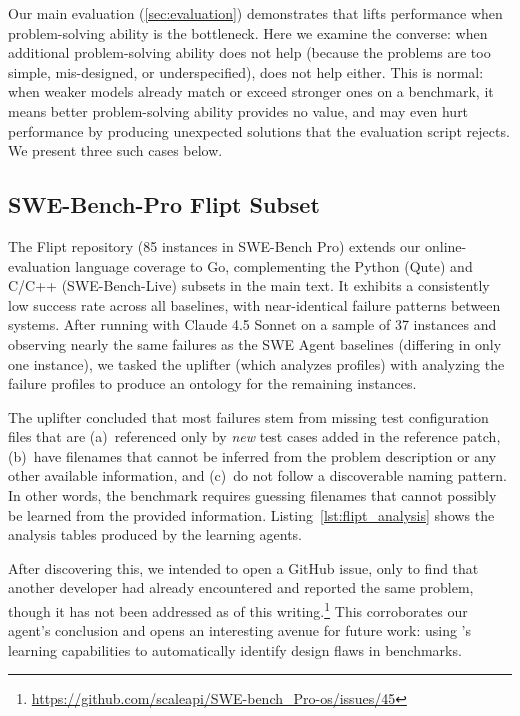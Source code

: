 Our main evaluation (\cref{sec:evaluation}) demonstrates that \sysname lifts performance when problem-solving ability is the bottleneck.
Here we examine the converse: when additional problem-solving ability does not help (because the problems are too simple, mis-designed, or underspecified), \sysname does not help either.
This is normal: when weaker models already match or exceed stronger ones on a benchmark, it means better problem-solving ability provides no value, and may even hurt performance by producing unexpected solutions that the evaluation script rejects.
We present three such cases below.

\subsection{SWE-Bench-Pro Flipt Subset}
\label{sec:app_flipt}

The Flipt repository (85 instances in SWE-Bench Pro) extends our online-evaluation language coverage to Go, complementing the Python (Qute) and C/C++ (SWE-Bench-Live) subsets in the main text. It exhibits a consistently low success rate across all baselines, with near-identical failure patterns between systems.
After running \sysname with Claude 4.5 Sonnet on a sample of 37 instances and observing nearly the same failures as the SWE Agent baselines (differing in only one instance), we tasked the uplifter (which analyzes profiles) with analyzing the failure profiles to produce an ontology for the remaining instances.

The uplifter concluded that most failures stem from missing test configuration files that are (a)~referenced only by \emph{new} test cases added in the reference patch, (b)~have filenames that cannot be inferred from the problem description or any other available information, and (c)~do not follow a discoverable naming pattern.
In other words, the benchmark requires guessing filenames that cannot possibly be learned from the provided information.
Listing~\ref{lst:flipt_analysis} shows the analysis tables produced by the learning agents.

After discovering this, we intended to open a GitHub issue, only to find that another developer had already encountered and reported the same problem, though it has not been addressed as of this writing.\footnote{\url{https://github.com/scaleapi/SWE-bench_Pro-os/issues/45}}
This corroborates our agent's conclusion and opens an interesting avenue for future work: using \sysname's learning capabilities to automatically identify design flaws in benchmarks.

